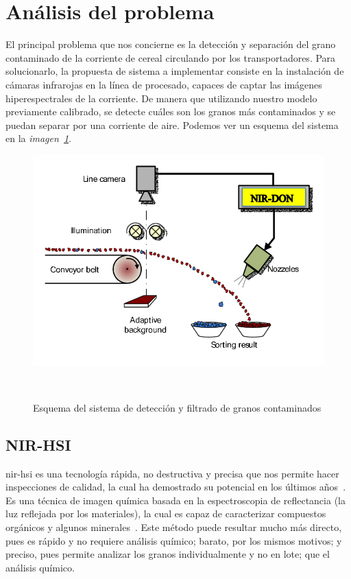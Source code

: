 \section{Análisis del problema}

El principal problema que nos concierne es la detección y separación del grano contaminado de la corriente de cereal circulando por los transportadores. Para solucionarlo,
la propuesta de sistema a implementar consiste en la instalación de cámaras infrarojas en la línea de procesado, capaces de captar las imágenes hiperespectrales de la
corriente. De manera que utilizando nuestro modelo previamente calibrado, se detecte cuáles son los granos más contaminados y se puedan separar por una corriente de aire. 
Podemos ver un esquema del sistema en la \textit{imagen\ \ref{fig:detection-system}}.

\begin{figure}[!h]
    \centering
    \includegraphics[width=0.7\linewidth]{media/images/esquema-del-sistema.png}
    \caption{Esquema del sistema de detección y filtrado de granos contaminados}\ \label{fig:detection-system}
\end{figure}


\subsection{NIR-HSI}


\gls{nir-hsi} es una tecnología rápida, no destructiva y precisa que nos permite hacer inspecciones de calidad, la cual ha demostrado su potencial en los últimos años\ \cite{Applicat5:online}. 
Es una técnica de imagen química basada en la espectroscopia de reflectancia (la luz reflejada por los materiales), la cual es capaz de caracterizar compuestos orgánicos y algunos minerales\ \cite{NIRHyper23:online}. Este método puede resultar mucho más directo, pues es rápido y no requiere análisis químico; barato, por los mismos motivos; y preciso, pues permite analizar los granos individualmente y no en lote; que el análisis químico.

